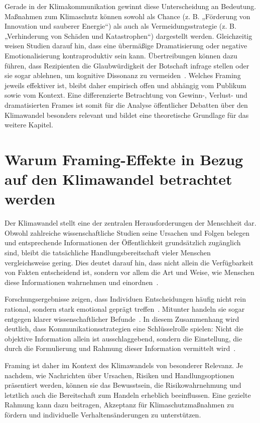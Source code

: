 \documentclass[
	12pt, %
	a4paper,
	listof=totoc, %
  bibliography=totoc, %
	numbers=noenddot, %
	german, %
	headsepline, %
	oneside %
	]{scrbook} %
\begin{document}
Gerade in der Klimakommunikation gewinnt diese Unterscheidung an Bedeutung. Maßnahmen zum Klimaschutz können sowohl als Chance (z. B. „Förderung von Innovation und sauberer Energie“) als auch als Vermeidungsstrategie (z. B. „Verhinderung von Schäden und Katastrophen“) dargestellt werden. Gleichzeitig weisen Studien darauf hin, dass eine übermäßige Dramatisierung oder negative Emotionalisierung kontraproduktiv sein kann. Übertreibungen können dazu führen, dass Rezipienten die Glaubwürdigkeit der Botschaft infrage stellen oder sie sogar ablehnen, um kognitive Dissonanz zu vermeiden~\parencite{bloodhart2019worried}. Welches Framing jeweils effektiver ist, bleibt daher empirisch offen und abhängig vom Publikum sowie vom Kontext. Eine differenzierte Betrachtung von Gewinn-, Verlust- und dramatisierten Frames ist somit für die Analyse öffentlicher Debatten über den Klimawandel besonders relevant und bildet eine theoretische Grundlage für das weitere Kapitel.

\section{Warum Framing-Effekte in Bezug auf den Klimawandel betrachtet werden}

Der Klimawandel stellt eine der zentralen Herausforderungen der Menschheit dar. Obwohl zahlreiche wissenschaftliche Studien seine Ursachen und Folgen belegen und entsprechende Informationen der Öffentlichkeit grundsätzlich zugänglich sind, bleibt die tatsächliche Handlungsbereitschaft vieler Menschen vergleichsweise gering. Dies deutet darauf hin, dass nicht allein die Verfügbarkeit von Fakten entscheidend ist, sondern vor allem die Art und Weise, wie Menschen diese Informationen wahrnehmen und einordnen~\parencite{Bertolotti}.

Forschungsergebnisse zeigen, dass Individuen Entscheidungen häufig nicht rein rational, sondern stark emotional geprägt treffen~\parencite{Myers2012}. Mitunter handeln sie sogar entgegen klarer wissenschaftlicher Befunde~\parencite{Bertolotti}. In diesem Zusammenhang wird deutlich, dass Kommunikationsstrategien eine Schlüsselrolle spielen: Nicht die objektive Information allein ist ausschlaggebend, sondern die Einstellung, die durch die Formulierung und Rahmung dieser Information vermittelt wird~\parencite{Myers2012}.

Framing ist daher im Kontext des Klimawandels von besonderer Relevanz. Je nachdem, wie Nachrichten über Ursachen, Risiken und Handlungsoptionen präsentiert werden, können sie das Bewusstsein, die Risikowahrnehmung und letztlich auch die Bereitschaft zum Handeln erheblich beeinflussen. Eine gezielte Rahmung kann dazu beitragen, Akzeptanz für Klimaschutzmaßnahmen zu fördern und individuelle Verhaltensänderungen zu unterstützen.
\end{document}
